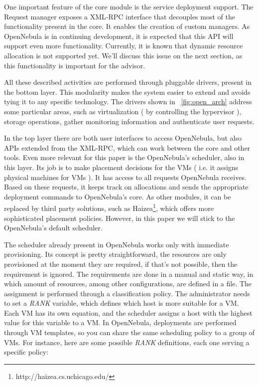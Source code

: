 One important feature of the core module is the service deployment support. The Request manager exposes a XML-RPC interface that decouples most of the functionality present in the core. It enables the creation of custom managers. As OpenNebula is in continuing development, it is expected that this API will support even more functionality. Currently, it is known that dynamic resource allocation is not supported yet. We'll discuss this issue on the next section, as this functionality is important for the advisor.

All these described activities are performed through pluggable drivers, present in the bottom layer. This modularity makes the system easier to extend and avoids tying it to any specific technology. The drivers shown in ~\ref{fig:open_arch}  address some particular areas, such as virtualization ( by controlling the hypervisor ), storage operations, gather monitoring information and authenticate user requests.

In the top layer there are both user interfaces to access OpenNebula, but also APIs extended from the XML-RPC, which can work between the core and other tools. Even more relevant for this paper is the OpenNebula's scheduler, also in this layer. Its job is to make placement decisions for the VMs ( i.e. it assigns physical machines for VMs ). It has access to all requests OpenNebula receives. Based on these requests, it keeps track on allocations and sends the appropriate deployment commands to OpenNebula's core. As other modules, it can be replaced by third party solutions, such as Haizea\footnote{http://haizea.cs.uchicago.edu/},  which offers more sophisticated placement policies. However, in this paper we will stick to the OpenNebula's default scheduler.

The scheduler already present in OpenNebula works only with immediate provisioning. Its concept is pretty straightforward, the resources are only provisioned at the moment they are required, if that's not possible, then the requirement is ignored. The requirements are done in a manual and static way, in which amount of resources, among other configurations, are defined in a file. The assignment is performed through a classification policy.  The administrator needs to set a \textit{RANK} variable, which defines which host is more suitable for a VM. Each VM has its own  equation, and the scheduler assigns a host with the highest value for this variable to a VM. In OpenNebula, deployments are performed through VM templates, so you can share the same scheduling policy  to a group of VMs. For instance, here are some possible \textit{RANK} definitions, each one serving a specific policy:

